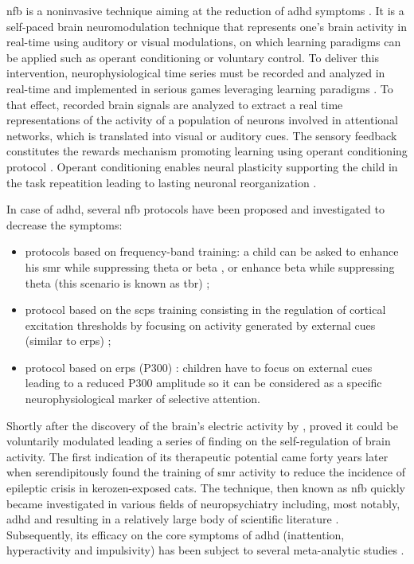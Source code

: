 \gls{nfb} is a noninvasive technique aiming at the reduction of \gls{adhd} symptoms \citep{Arns2015, Steffert2010,
  Marzbani2016}. It is a self-paced brain neuromodulation technique that represents one's brain activity in real-time
using auditory or visual modulations, on which learning paradigms can be applied such as operant conditioning
\citep{Reynolds1975} or voluntary control. To deliver this intervention, neurophysiological time series must be recorded
and analyzed in real-time and implemented in serious games leveraging learning paradigms \citep{Wang2010}. To that
effect, recorded brain signals are analyzed to extract a real time representations of the activity of a population of
neurons involved in attentional networks, which is translated into visual or auditory cues. The sensory feedback
constitutes the rewards mechanism promoting learning using operant conditioning protocol \citep{Sherlin2011}. Operant
conditioning enables neural plasticity supporting the child in the task repeatition \citep{Skinner1961} leading to
lasting neuronal reorganization \citep{VanDoren2017}. 

In case of \gls{adhd}, several \gls{nfb} protocols have been proposed and investigated to decrease the symptoms:
\begin{itemize} 
  \item protocols based on frequency-band training: a child can be asked to enhance his \gls{smr} while
    suppressing theta or beta \citep{Lubar1976}, or enhance beta while suppressing theta (this scenario is known as
    \gls{tbr}) \citep{Arns2013}; 
  \item protocol based on the \glspl{scp} training consisting in the regulation of
    cortical excitation thresholds by focusing on activity generated by external cues (similar to \glspl{erp})
    \citep{Heinrich2004, Banaschewski2007}; 
  \item protocol based on \glspl{erp} (P300) \citep{Fouillen2017}: children
    have to focus on external cues leading to a reduced P300 amplitude so it can be considered as a specific
    neurophysiological marker of selective attention.  
\end{itemize} 

Shortly after the discovery of the brain's electric activity by \citet{Berger1929}, \citet{Durup1935} proved it could be
voluntarily modulated leading a series of finding on the self-regulation of brain activity. The first indication of its
therapeutic potential came forty years later when \citet{Sterman1974} serendipitously found the training of \gls{smr}
activity to reduce the incidence of epileptic crisis in kerozen-exposed cats. The technique, then known as \gls{nfb}
quickly became investigated in various fields of neuropsychiatry including, most notably, \gls{adhd} and resulting in a
relatively large body of scientific literature \citep{Lubar1976, Rossiter1995, Linden1996, Maurizio2014}. Subsequently,
its efficacy on the core symptoms of \gls{adhd} (inattention, hyperactivity and impulsivity) has been subject to several
meta-analytic studies \citep{Loo2005, Lofthouse2012, Arns2009, Micoulaud2014, Sonuga-Barke2013}. 


